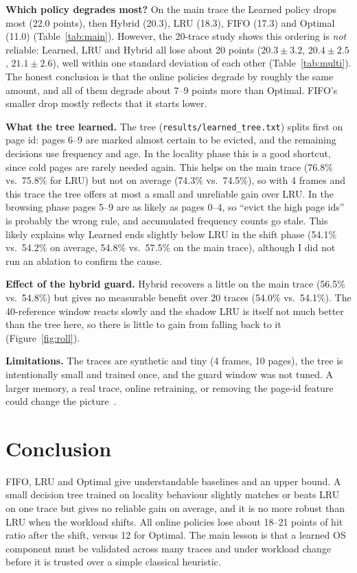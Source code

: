\documentclass[10pt,a4paper]{article}
\begin{document}
\textbf{Which policy degrades most?} On the main trace the Learned policy drops most (22.0 points), then Hybrid (20.3), LRU (18.3), FIFO (17.3) and Optimal (11.0) (Table~\ref{tab:main}). However, the 20-trace study shows this ordering is \emph{not} reliable: Learned, LRU and Hybrid all lose about 20 points ($20.3\pm3.2$, $20.4\pm2.5$, $21.1\pm2.6$), well within one standard deviation of each other (Table~\ref{tab:multi}). The honest conclusion is that the online policies degrade by roughly the same amount, and all of them degrade about 7--9 points more than Optimal. FIFO's smaller drop mostly reflects that it starts lower.

\textbf{What the tree learned.} The tree (\texttt{results/learned\_tree.txt}) splits first on page id: pages 6--9 are marked almost certain to be evicted, and the remaining decisions use frequency and age. In the locality phase this is a good shortcut, since cold pages are rarely needed again. This helps on the main trace (76.8\% vs.\ 75.8\% for LRU) but not on average (74.3\% vs.\ 74.5\%), so with 4 frames and this trace the tree offers at most a small and unreliable gain over LRU. In the browsing phase pages 5--9 are as likely as pages 0--4, so ``evict the high page ids'' is probably the wrong rule, and accumulated frequency counts go stale. This likely explains why Learned ends slightly below LRU in the shift phase (54.1\% vs.\ 54.2\% on average, 54.8\% vs.\ 57.5\% on the main trace), although I did not run an ablation to confirm the cause.

\textbf{Effect of the hybrid guard.} Hybrid recovers a little on the main trace (56.5\% vs.\ 54.8\%) but gives no measurable benefit over 20 traces (54.0\% vs.\ 54.1\%). The 40-reference window reacts slowly and the shadow LRU is itself not much better than the tree here, so there is little to gain from falling back to it (Figure~\ref{fig:roll}).

\textbf{Limitations.} The traces are synthetic and tiny (4 frames, 10 pages), the tree is intentionally small and trained once, and the guard window was not tuned. A larger memory, a real trace, online retraining, or removing the page-id feature could change the picture~\cite{lykouris2018}.

\section{Conclusion}
FIFO, LRU and Optimal give understandable baselines and an upper bound. A small decision tree trained on locality behaviour slightly matches or beats LRU on one trace but gives no reliable gain on average, and it is no more robust than LRU when the workload shifts. All online policies lose about 18--21 points of hit ratio after the shift, versus 12 for Optimal. The main lesson is that a learned OS component must be validated across many traces and under workload change before it is trusted over a simple classical heuristic.
\end{document}
